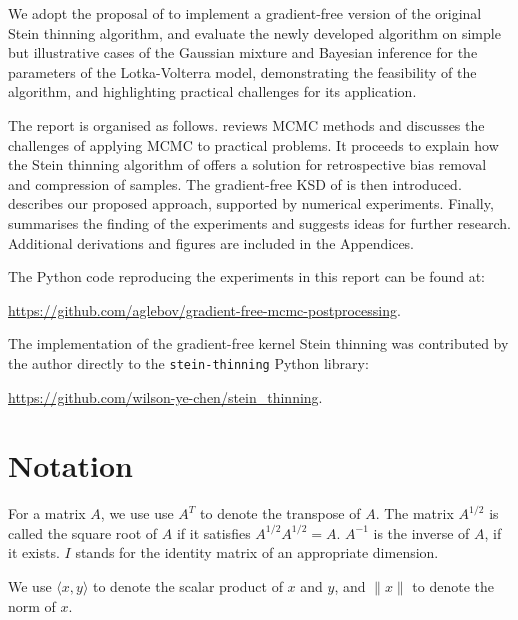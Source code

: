 \documentclass[11pt,a4paper]{report}
\begin{document}
We adopt the proposal of \cite{fisherGradientFreeKernelStein2024} to implement a gradient-free version of the original Stein thinning algorithm, and evaluate the newly developed algorithm on simple but illustrative cases of the Gaussian mixture and Bayesian inference for the parameters of the Lotka-Volterra model, demonstrating the feasibility of the algorithm, and highlighting practical challenges for its application.

The report is organised as follows.  reviews MCMC methods and discusses the challenges of applying MCMC to practical problems. It proceeds to explain how the Stein thinning algorithm of \cite{riabizOptimalThinningMCMC2022} offers a solution for retrospective bias removal and compression of samples. The gradient-free KSD of \cite{fisherGradientFreeKernelStein2024} is then introduced.  describes our proposed approach, supported by numerical experiments. Finally,  summarises the finding of the experiments and suggests ideas for further research. Additional derivations and figures are included in the Appendices.

The Python code reproducing the experiments in this report can be found at:
\begin{center}
\vspace{-10pt}
\url{https://github.com/aglebov/gradient-free-mcmc-postprocessing}.
\vspace{-10pt}
\end{center}
The implementation of the gradient-free kernel Stein thinning was contributed by the author directly to the \texttt{stein-thinning} Python library:
\begin{center}
\vspace{-10pt}
\url{https://github.com/wilson-ye-chen/stein_thinning}.
\end{center}

\chapter*{Notation}

For a matrix $A$, we use use $A^T$ to denote the transpose of $A$. The matrix $A^{1/2}$ is called the square root of $A$ if it satisfies $A^{1/2} A^{1/2} = A$. $A^{-1}$ is the inverse of $A$, if it exists. $I$ stands for the identity matrix of an appropriate dimension.

We use $\langle x, y \rangle$ to denote the scalar product of $x$ and $y$, and $\| x \|$ to denote the norm of $x$.
\end{document}
